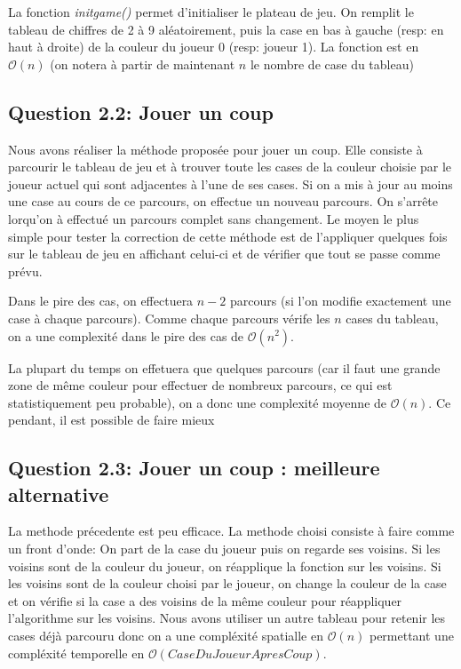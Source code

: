 \documentclass[11pt]{article}
\begin{document}
La fonction \textit{initgame()} permet d'initialiser le plateau de jeu. On remplit le tableau de chiffres de 2 à 9 aléatoirement, puis la case en bas à gauche (resp: en haut à droite) de la couleur du joueur 0 (resp: joueur 1). La fonction est en $\mathcal{O}(n)$ (on notera à partir de maintenant $n$ le nombre de case du tableau)

    \subsection{Question 2.2: Jouer un coup}
    Nous avons réaliser la méthode proposée pour jouer un coup. Elle consiste à parcourir le tableau de jeu et à trouver toute les cases de la couleur choisie par le joueur actuel qui sont adjacentes à l'une de ses cases. Si on a mis à jour au moins une case au cours de ce parcours, on effectue un nouveau parcours. On s'arrête lorqu'on à effectué un parcours complet sans changement. Le moyen le plus simple pour tester la correction de cette méthode est de l'appliquer quelques fois sur le tableau de jeu en affichant celui-ci et de vérifier que tout se passe comme prévu.

    Dans le pire des cas, on effectuera $n-2$ parcours (si l'on modifie exactement une case à chaque parcours). Comme chaque parcours vérife les $n$ cases du tableau, on a une complexité dans le pire des cas de $\mathcal{O}(n^2)$.

    La plupart du temps on effetuera que quelques parcours (car il faut une grande zone de même couleur pour effectuer de nombreux parcours, ce qui est statistiquement peu probable), on a donc une complexité moyenne de $\mathcal{O}(n)$. Ce pendant, il est possible de faire mieux

    \subsection{Question 2.3: Jouer un coup : meilleure alternative}
    La methode précedente est peu efficace. La methode choisi consiste à faire comme un front d'onde: On part de la case du joueur puis on regarde ses voisins. Si les voisins sont de la couleur du joueur, on réapplique la fonction sur les voisins. Si les voisins sont de la couleur choisi par le joueur, on change la couleur de la case et on vérifie si la case a des voisins de la même couleur pour réappliquer l'algorithme sur les voisins. Nous avons utiliser un autre tableau pour retenir les cases déjà parcouru donc on a une compléxité spatialle en $\mathcal{O}(n)$ permettant une compléxité temporelle en $\mathcal{O}(CaseDuJoueurApresCoup)$.
\end{document}
